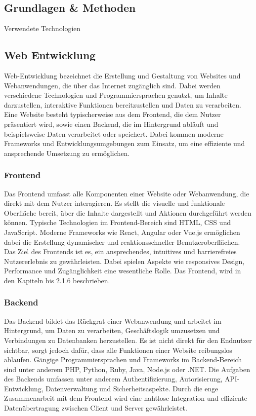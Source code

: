 \begin{inhalt}
\chapter{Grundlagen \& Methoden}
\renewcommand*\chapterpagestyle{scrheadings}

Verwendete Technologien 
\section{Web Entwicklung}

Web-Entwicklung \cite{WebEntwicklung} bezeichnet die Erstellung und Gestaltung von Websites und Webanwendungen, die über das Internet zugänglich sind. Dabei werden verschiedene Technologien und Programmiersprachen genutzt, um Inhalte darzustellen, interaktive Funktionen bereitzustellen und Daten zu verarbeiten. Eine Website besteht typischerweise aus dem Frontend, die dem Nutzer präsentiert wird, sowie einen Backend, die im Hintergrund abläuft und beispielsweise Daten verarbeitet oder speichert. Dabei kommen moderne Frameworks und Entwicklungsumgebungen zum Einsatz, um eine effiziente und ansprechende Umsetzung zu ermöglichen. 

\subsection{Frontend} 

Das Frontend \cite{FrontendBackend} umfasst alle Komponenten einer Website oder Webanwendung, die direkt mit dem Nutzer interagieren. Es stellt die visuelle und funktionale Oberfläche bereit, über die Inhalte dargestellt und Aktionen durchgeführt werden können. Typische Technologien im Frontend-Bereich sind HTML, CSS und JavaScript. Moderne Frameworks wie React, Angular oder Vue.js ermöglichen dabei die Erstellung dynamischer und reaktionsschneller Benutzeroberflächen. Das Ziel des Frontends ist es, ein ansprechendes, intuitives und barrierefreies Nutzererlebnis zu gewährleisten. Dabei spielen Aspekte wie responsives Design, Performance und Zugänglichkeit eine wesentliche Rolle. Das Frontend, wird in den Kapiteln bis 2.1.6 beschrieben. 

\subsection{Backend}

Das Backend \cite{FrontendBackend} bildet das Rückgrat einer Webanwendung und arbeitet im Hintergrund, um Daten zu verarbeiten, Geschäftslogik umzusetzen und Verbindungen zu Datenbanken herzustellen. Es ist nicht direkt für den Endnutzer sichtbar, sorgt jedoch dafür, dass alle Funktionen einer Website reibungslos ablaufen. Gängige Programmiersprachen und Frameworks im Backend-Bereich sind unter anderem PHP, Python, Ruby, Java, Node.js oder .NET. Die Aufgaben des Backends umfassen unter anderem Authentifizierung, Autorisierung, API-Entwicklung, Datenverwaltung und Sicherheitsaspekte. Durch die enge Zusammenarbeit mit dem Frontend wird eine nahtlose Integration und effiziente Datenübertragung zwischen Client und Server gewährleistet.


\end{inhalt}
